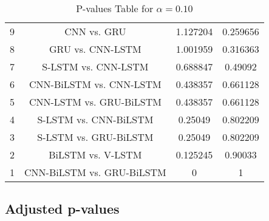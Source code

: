 \documentclass[a4paper,10pt]{article}
\begin{document}
\begin{landscape}
\begin{table}[!htp]
\begin{tabular}{cccc}
9&CNN vs. GRU&1.127204&0.259656\\
8&GRU vs. CNN-LSTM&1.001959&0.316363\\
7&S-LSTM vs. CNN-LSTM&0.688847&0.49092\\
6&CNN-BiLSTM vs. CNN-LSTM&0.438357&0.661128\\
5&CNN-LSTM vs. GRU-BiLSTM&0.438357&0.661128\\
4&S-LSTM vs. CNN-BiLSTM&0.25049&0.802209\\
3&S-LSTM vs. GRU-BiLSTM&0.25049&0.802209\\
2&BiLSTM vs. V-LSTM&0.125245&0.90033\\
1&CNN-BiLSTM vs. GRU-BiLSTM&0&1\\
\hline
\end{tabular}
\caption{P-values Table for $\alpha=0.10$}
\end{table}\pagebreak

\subsection{Adjusted p-values}


\end{landscape}
\end{document}
